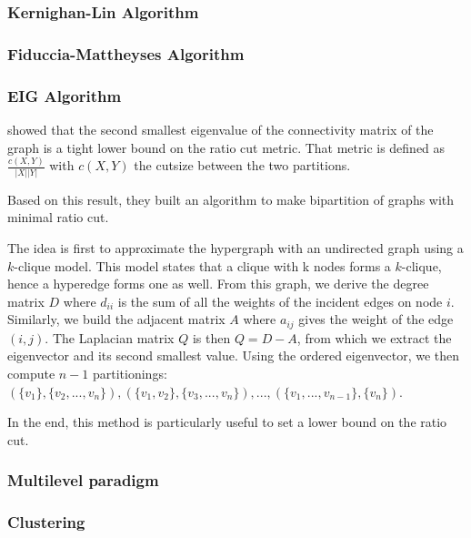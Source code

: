 \documentclass[11pt,a4paper]{article}
\theoremstyle{customdef}
\begin{document}
\subsubsection{Kernighan-Lin Algorithm~\citep*{Kernighan1970}}

\subsubsection{Fiduccia-Mattheyses Algorithm~\citep*{Fiduccia1982}}

\subsubsection{EIG Algorithm~\citep*{Hagen1992}}
\citet{Hagen1992} showed that the second smallest eigenvalue of the connectivity matrix of the graph is a tight lower bound on the ratio cut metric.
That metric is defined as $\frac{c(X,Y)}{|X||Y|}$ with $c(X, Y)$ the cutsize between the two partitions.

Based on this result, they built an algorithm to make bipartition of graphs with minimal ratio cut.

The idea is first to approximate the hypergraph with an undirected graph using a $k$-clique model.
This model states that a clique with k nodes forms a $k$-clique, hence a hyperedge forms one as well.
From this graph, we derive the degree matrix $D$ where  $d_{ii}$ is the sum of all the weights of the incident edges on node $i$.
Similarly, we build the adjacent matrix $A$ where $a_{ij}$ gives the weight of the edge $(i, j)$.
The Laplacian matrix $Q$ is then $Q = D - A$, from which we extract the eigenvector and its second smallest value.
Using the ordered eigenvector, we then compute $n-1$ partitionings: $(\{v_1\}, \{v_2, ..., v_n\}), (\{v_1, v_2\}, \{v_3, ..., v_n\}), ..., (\{v_1, ..., v_{n-1}\}, \{v_n\})$.

In the end, this method is particularly useful to set a lower bound on the ratio cut.


\subsubsection{Multilevel paradigm}
\subsubsection{Clustering}
\end{document}
